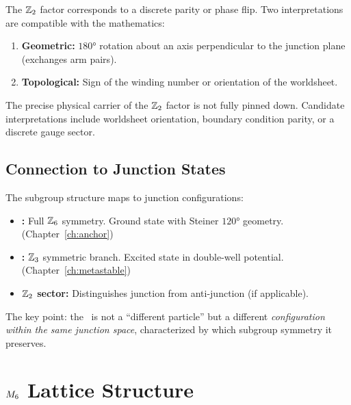The $\Ztwo$ factor corresponds to a discrete parity or phase flip. Two
interpretations are compatible with the mathematics:

\begin{enumerate}
    \item \textbf{Geometric:} $180°$ rotation about an axis perpendicular
          to the junction plane (exchanges arm pairs).
    \item \textbf{Topological:} Sign of the winding number or orientation
          of the worldsheet.
\end{enumerate}

\begin{edcopenbox}[title=OPEN: $\Ztwo$ Carrier Identification]
    The precise physical carrier of the $\Ztwo$ factor is not fully pinned
    down. Candidate interpretations include worldsheet orientation, boundary
    condition parity, or a discrete gauge sector. \tagOpen
\end{edcopenbox}

\subsection{Connection to Junction States}

The subgroup structure maps to junction configurations:

\begin{resultbox}[title=Junction--Subgroup Correspondence]
    \begin{itemize}
        \item \textbf{\AnchorJunction:} Full $\mathbb{Z}_6$ symmetry.
              Ground state with Steiner $120°$ geometry.
              (Chapter~\ref{ch:anchor})
        \item \textbf{\MetastableJunction:} $\mathbb{Z}_3$ symmetric branch.
              Excited state in double-well potential.
              (Chapter~\ref{ch:metastable})
        \item \textbf{$\Ztwo$ sector:} Distinguishes junction from anti-junction
              (if applicable).
    \end{itemize}
    \tagDc
\end{resultbox}

The key point: the \MetastableJunction\ is not a ``different particle'' but
a different \emph{configuration within the same junction space}, characterized
by which subgroup symmetry it preserves.

\section{$M_6$ Lattice Structure}
\label{sec:junction:M6}

